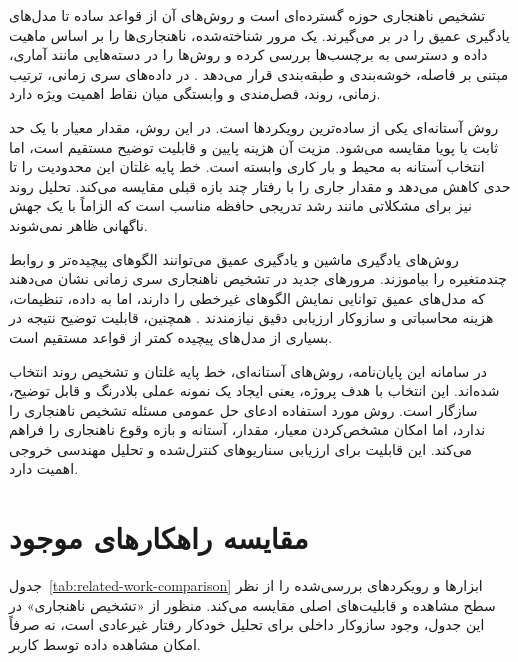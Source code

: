 تشخیص ناهنجاری حوزه گسترده‌ای است و روش‌های آن از قواعد ساده تا مدل‌های
یادگیری عمیق را در بر می‌گیرند. یک مرور شناخته‌شده، ناهنجاری‌ها را بر
اساس ماهیت داده و دسترسی به برچسب‌ها بررسی کرده و روش‌ها را در دسته‌هایی
مانند آماری، مبتنی بر فاصله، خوشه‌بندی و طبقه‌بندی قرار می‌دهد
\cite{chandolasurvey}. در داده‌های سری زمانی، ترتیب زمانی، روند،
فصل‌مندی و وابستگی میان نقاط اهمیت ویژه دارد.

روش آستانه‌ای یکی از ساده‌ترین رویکردها است. در این روش، مقدار معیار با
یک حد ثابت یا پویا مقایسه می‌شود. مزیت آن هزینه پایین و قابلیت توضیح
مستقیم است، اما انتخاب آستانه به محیط و بار کاری وابسته است. خط پایه
غلتان این محدودیت را تا حدی کاهش می‌دهد و مقدار جاری را با رفتار چند
بازه قبلی مقایسه می‌کند. تحلیل روند نیز برای مشکلاتی مانند رشد تدریجی
حافظه مناسب است که الزاماً با یک جهش ناگهانی ظاهر نمی‌شوند.

روش‌های یادگیری ماشین و یادگیری عمیق می‌توانند الگوهای پیچیده‌تر و روابط
چندمتغیره را بیاموزند. مرورهای جدید در تشخیص ناهنجاری سری زمانی نشان
می‌دهند که مدل‌های عمیق توانایی نمایش الگوهای غیرخطی را دارند، اما به
داده، تنظیمات، هزینه محاسباتی و سازوکار ارزیابی دقیق نیازمندند
\cite{deepanomalysurvey}. همچنین، قابلیت توضیح نتیجه در بسیاری از
مدل‌های پیچیده کمتر از قواعد مستقیم است.

در سامانه این پایان‌نامه، روش‌های آستانه‌ای، خط پایه غلتان و تشخیص روند
انتخاب شده‌اند. این انتخاب با هدف پروژه، یعنی ایجاد یک نمونه عملی
بلادرنگ و قابل توضیح، سازگار است. روش مورد استفاده ادعای حل عمومی مسئله
تشخیص ناهنجاری را ندارد، اما امکان مشخص‌کردن معیار، مقدار، آستانه و بازه
وقوع ناهنجاری را فراهم می‌کند. این قابلیت برای ارزیابی سناریوهای
کنترل‌شده و تحلیل مهندسی خروجی اهمیت دارد.

\section{مقایسه راهکارهای موجود}
\label{sec:related-work-comparison}

جدول~\ref{tab:related-work-comparison} ابزارها و رویکردهای بررسی‌شده را
از نظر سطح مشاهده و قابلیت‌های اصلی مقایسه می‌کند. منظور از «تشخیص
ناهنجاری» در این جدول، وجود سازوکار داخلی برای تحلیل خودکار رفتار
غیرعادی است، نه صرفاً امکان مشاهده داده توسط کاربر.

